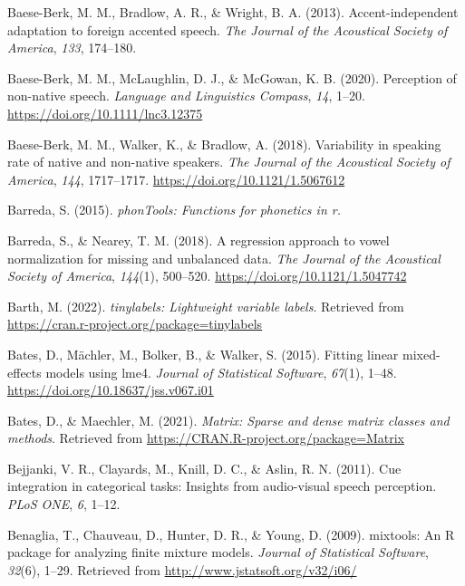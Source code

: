 \documentclass[
  11pt,
  english,
  man,floatsintext]{apa6}
\newlength{\cslhangindent}
\newlength{\cslentryspacingunit} %
\newenvironment{CSLReferences}[2] %
 {%
  \setlength{\parindent}{0pt}
  \ifodd #1
  \let\oldpar\par
  \def\par{\hangindent=\cslhangindent\oldpar}
  \fi
  \setlength{\parskip}{#2\cslentryspacingunit}
 }%
 {}
\begin{document}
\begin{CSLReferences}{1}{0}
\leavevmode{}%
Baese-Berk, M. M., Bradlow, A. R., \& Wright, B. A. (2013). Accent-independent adaptation to foreign accented speech. \emph{The Journal of the Acoustical Society of America}, \emph{133}, 174--180.

\leavevmode{}%
Baese-Berk, M. M., McLaughlin, D. J., \& McGowan, K. B. (2020). Perception of non-native speech. \emph{Language and Linguistics Compass}, \emph{14}, 1--20. \url{https://doi.org/10.1111/lnc3.12375}

\leavevmode{}%
Baese-Berk, M. M., Walker, K., \& Bradlow, A. (2018). Variability in speaking rate of native and non-native speakers. \emph{The Journal of the Acoustical Society of America}, \emph{144}, 1717--1717. \url{https://doi.org/10.1121/1.5067612}

\leavevmode{}%
Barreda, S. (2015). \emph{phonTools: Functions for phonetics in r.}

\leavevmode{}%
Barreda, S., \& Nearey, T. M. (2018). A regression approach to vowel normalization for missing and unbalanced data. \emph{The Journal of the Acoustical Society of America}, \emph{144}(1), 500--520. \url{https://doi.org/10.1121/1.5047742}

\leavevmode{}%
Barth, M. (2022). \emph{{tinylabels}: Lightweight variable labels}. Retrieved from \url{https://cran.r-project.org/package=tinylabels}

\leavevmode{}%
Bates, D., Mächler, M., Bolker, B., \& Walker, S. (2015). Fitting linear mixed-effects models using {lme4}. \emph{Journal of Statistical Software}, \emph{67}(1), 1--48. \url{https://doi.org/10.18637/jss.v067.i01}

\leavevmode{}%
Bates, D., \& Maechler, M. (2021). \emph{Matrix: Sparse and dense matrix classes and methods}. Retrieved from \url{https://CRAN.R-project.org/package=Matrix}

\leavevmode{}%
Bejjanki, V. R., Clayards, M., Knill, D. C., \& Aslin, R. N. (2011). Cue integration in categorical tasks: Insights from audio-visual speech perception. \emph{PLoS ONE}, \emph{6}, 1--12.

\leavevmode{}%
Benaglia, T., Chauveau, D., Hunter, D. R., \& Young, D. (2009). {mixtools}: An {R} package for analyzing finite mixture models. \emph{Journal of Statistical Software}, \emph{32}(6), 1--29. Retrieved from \url{http://www.jstatsoft.org/v32/i06/}


\end{CSLReferences}
\end{document}
